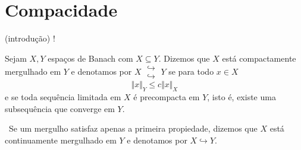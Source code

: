 \documentclass[a4paper, 11pt]{book}
\theoremstyle{definition}
\newcommand{\obs}{\noindent{\textbf{\textcolor{black}{\sffamily Observação:}}}~}
\newcommand{\doublehookrightarrow}{\;\substack{\hookrightarrow \\ \hookrightarrow}\;}
\begin{document}
\section{Compacidade}

(introdução) !

\begin{dbox}
    Sejam $X, Y$ espaços de Banach com $X \subseteq Y$. Dizemos que $X$ está compactamente mergulhado em $Y$ e denotamos por $X \doublehookrightarrow Y$
    se para todo $x \in X$
    \[
        \Vert x \Vert_{Y} \leqslant c \Vert x \Vert_X
    \]
    e se toda sequência limitada em $X$ é precompacta em $Y$, isto é, existe uma subsequência que converge em $Y$.
\end{dbox}

\obs Se um mergulho satisfaz apenas a primeira propiedade, dizemos que $X$ está continuamente mergulhado em $Y$ e denotamos por $X \hookrightarrow Y$.
\end{document}
